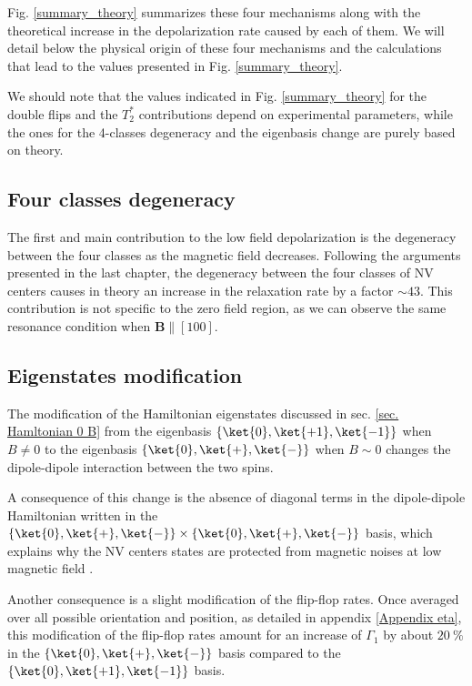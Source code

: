 \documentclass[a4paper, 11pt]{report}
\begin{document}
Fig. \ref{summary_theory} summarizes these four mechanisms along with the theoretical increase in the depolarization rate caused by each of them. We will detail below the physical origin of these four mechanisms and the calculations that lead to the values presented in Fig. \ref{summary_theory}.

We should note that the values indicated in Fig. \ref{summary_theory} for the double flips and the $T_2^*$ contributions depend on experimental parameters, while the ones for the 4-classes degeneracy and the eigenbasis change are purely based on theory.

\subsection{Four classes degeneracy}

The first and main contribution to the low field depolarization is the degeneracy between the four classes as the magnetic field decreases. Following the arguments presented in the last chapter, the degeneracy between the four classes of NV centers causes in theory an increase in the relaxation rate by a factor $\sim 43$. This contribution is not specific to the zero field region, as we can observe the same resonance condition when $\mathbf{B} \parallel [100]$.


\subsection{Eigenstates modification}

The modification of the Hamiltonian eigenstates discussed in sec. \ref{sec. Hamltonian 0 B} from the eigenbasis $\{ \ket{0}, \ket{+1},\ket{-1} \}$ when $B\neq 0$ to the eigenbasis $\{ \ket{0}, \ket{+},\ket{-} \}$ when $B\sim 0$ changes the dipole-dipole interaction between the two spins. 

A consequence of this change is the absence of diagonal terms  in the dipole-dipole Hamiltonian written in the $\{ \ket{0}, \ket{+},\ket{-} \} \times \{ \ket{0}, \ket{+},\ket{-} \}$ basis, which explains why the NV centers states are protected from magnetic noises at low magnetic field \citep{jamonneau2016competition}. 

Another consequence is a slight modification of the flip-flop rates. Once averaged over all possible orientation and position, as detailed in appendix \ref{Appendix eta}, this modification of the flip-flop rates amount for an increase of $\Gamma_1$ by about $20\ \%$ in the $\{ \ket{0}, \ket{+},\ket{-} \}$ basis compared to the $\{ \ket{0}, \ket{+1},\ket{-1} \}$ basis.
\end{document}
